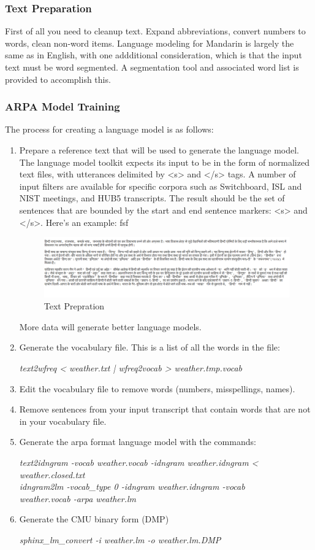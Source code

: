 \documentclass[12pt,a4paper,oneside]{memoir}
\begin{document}
\subsubsection{Text Preparation}
First of all you need to cleanup text. Expand abbreviations, convert numbers to words, clean non-word items. Language modeling for Mandarin is largely the same as in English, with one addditional consideration, which is that the input text must be word segmented. A segmentation tool and associated word list is provided to accomplish this. 
\subsubsection{ARPA Model Training}
The process for creating a language model is as follows:
\begin{enumerate}
  \item  Prepare a reference text that will be used to generate the language model. The language model toolkit expects its input to be in the form of normalized text files, with utterances delimited by <s> and </s> tags. A number of input filters are available for specific corpora such as Switchboard, ISL and NIST meetings, and HUB5 transcripts. The result should be the set of sentences that are bounded by the start and end sentence markers: <s> and </s>. Here's an example: fsf

\begin{figure}[h]
    \centering
    \includegraphics[scale=0.3]{jagjit2}
    \caption{Text Prepration}
\end{figure}

More data will generate better language models. 

  \item  Generate the vocabulary file. This is a list of all the words in the file:

	\textit{text2wfreq < weather.txt | wfreq2vocab > weather.tmp.vocab} 
  \item Edit the vocabulary file to remove words (numbers, misspellings, names).
  \item Remove sentences from your input transcript that contain words that are not in your vocabulary file.
  \item Generate the arpa format language model with the commands:

	 \textit{text2idngram -vocab weather.vocab -idngram weather.idngram < weather.closed.txt \\
	 idngram2lm -vocab\_type 0 -idngram weather.idngram -vocab \ \\
     	 weather.vocab -arpa weather.lm}
  \item Generate the CMU binary form (DMP) 

	\textit{sphinx\_lm\_convert -i weather.lm -o weather.lm.DMP}
\end{enumerate}
\end{document}
